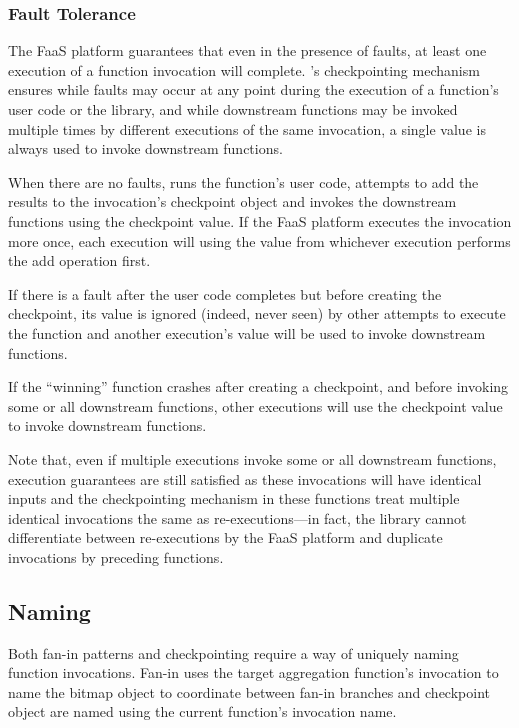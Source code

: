 \subsubsection{Fault Tolerance}

The FaaS platform guarantees that even in the presence of faults, at least one
execution of a function invocation will complete. \name{}'s checkpointing
mechanism ensures while faults may occur at any point during the execution of a
function's user code or the \name{} library, and while downstream functions may
be invoked multiple times by different executions of the same invocation, a
single value is always used to invoke downstream functions.

When there are no faults, \name{} runs the function's user code, attempts to add
the results to the invocation's checkpoint object and invokes the downstream
functions using the checkpoint value. If the FaaS platform executes the
invocation more once, each execution will using the value from whichever
execution performs the add operation first.

If there is a fault after the user code completes but before creating the
checkpoint, its value is ignored (indeed, never seen) by other attempts to
execute the function and another execution's value will be used to invoke
downstream functions.

If the ``winning'' function crashes after creating a checkpoint, and before
invoking some or all downstream functions, other executions will use the
checkpoint value to invoke downstream functions.

Note that, even if multiple executions invoke some or all downstream functions,
execution guarantees are still satisfied as these invocations will have
identical inputs and the checkpointing mechanism in these functions treat
multiple identical invocations the same as re-executions---in fact, the \name{}
library cannot differentiate between re-executions by the FaaS platform and
duplicate invocations by preceding functions.

\subsection{Naming}\label{sec:design:naming}

Both fan-in patterns and checkpointing require a way of uniquely naming function
invocations. Fan-in uses the target aggregation function's invocation to name
the bitmap object to coordinate between fan-in branches and checkpoint object
are named using the current function's invocation name.

